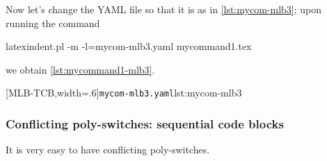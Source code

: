  \begin{example}
 Now let's change the YAML file so that it is as in \cref{lst:mycom-mlb3}; upon running
 the command

 \begin{commandshell}
latexindent.pl -m -l=mycom-mlb3.yaml mycommand1.tex
\end{commandshell}

 we obtain \cref{lst:mycommand1-mlb3}.

 \begin{cmhtcbraster}[
   raster force size=false,
   raster column 1/.style={add to width=-1cm},
  ]
  [MLB-TCB,width=.6\textwidth]{\texttt{mycom-mlb3.yaml}}{lst:mycom-mlb3}
 \end{cmhtcbraster}
 \end{example}

\subsubsection{Conflicting poly-switches: sequential code blocks}
 It is very easy to have conflicting poly-switches.

